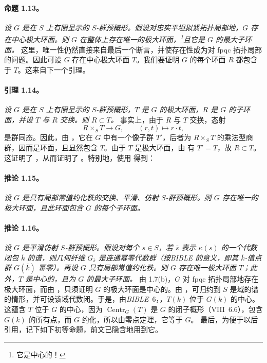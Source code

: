 \paragraph{\textbf{命题 1.13。}}
\emph{设 \(G\) 是在 \(S\) 上有限呈示的 \(S\)-群预概形。假设对忠实平坦拟紧拓扑局部地，\(G\) 存在中心极大环面。则 \(G\) 在整体上存在唯一的极大环面，\footnote{它是中心的！}且它是 \(G\) 的最大子环面。}
这里，唯一性仍然直接来自最后一个断言，并使存在性成为对 fpqc 拓扑局部的问题。因此可设 \(G\) 存在中心极大环面 \(T\)。我们要证明 \(G\) 的每个环面 \(R\) 都包含于 \(T\)。这来自下一个引理。
\paragraph{\textbf{引理 1.14。}}
\emph{设 \(G\) 是在 \(S\) 上有限呈示的 \(S\)-群预概形，\(T\) 是 \(G\) 的极大环面，\(R\) 是 \(G\) 的子环面，并设 \(T\) 与 \(R\) 交换。则 \(R\subset T\)。}
事实上，由于 \(R\) 与 \(T\) 交换，态射
\[
  R\times_S T\longrightarrow G,\qquad (r,t)\longmapsto r\cdot t,
\]
是群同态。因此，由 ，它在 \(G\) 中有一个像子群 \(T'\)，后者为 \(R\times_S T\) 的乘法型商群，因而是环面，且显然包含 \(T\)。由于 \(T\) 是极大环面，由  有 \(T'=T\)，故 \(R\subset T\)。这证明了 ，从而证明了 。特别地，使用  得到：
\paragraph{\textbf{推论 1.15。}}
\emph{设 \(G\) 是具有局部常值约化秩的交换、平滑、仿射 \(S\)-群预概形。则 \(G\) 存在唯一的极大环面，且此环面包含 \(G\) 的每个子环面。}
\paragraph{\textbf{推论 1.16。}}
\emph{设 \(G\) 是平滑仿射 \(S\)-群预概形。假设对每个 \(s\in S\)，若 \(\bar s\) 表示 \(\kappa(s)\) 的一个代数闭包 \(\bar k\) 的谱，则几何纤维 \(G_{\bar s}\) 是连通幂零代数群（按\emph{BIBLE} 的意义，即其 \(\bar k\)-值点群 \(G(\bar k)\) 幂零）。再设 \(G\) 具有局部常值约化秩。则 \(G\) 存在唯一极大环面 \(T\)；此外，\(T\) 是中心的，且为 \(G\) 的最大子环面。}
由 1.7(b)，\(G\) 对 fpqc 拓扑局部地存在极大环面，而由 ，只须证明 \(G\) 的极大环面是中心的。由 ，可归约到 \(S\) 是域的谱的情形，并可设该域代数闭。于是，由\emph{BIBLE}~6，，\(T(k)\) 位于 \(G(k)\) 的中心。这蕴含 \(T\) 位于 \(G\) 的中心，因为 \(\operatorname{Centr}_G(T)\) 是 \(G\) 的闭子概形（VIII~6.6），包含 \(G(k)\) 的所有点，而 \(G\) 约化，所以由零点定理，它等于 \(G\)。
最后，为便于以后引用，记下如下初等命题，前文已隐含地用到它。
